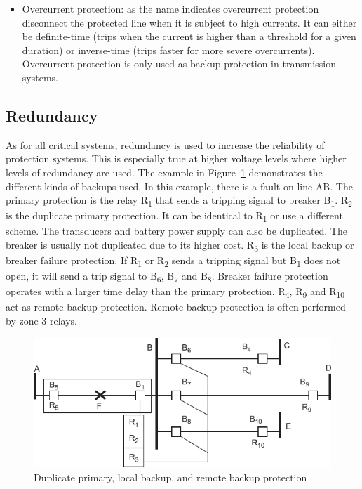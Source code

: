 \begin{itemize}
    \item Overcurrent protection: as the name indicates overcurrent protection disconnect the protected line when it is subject to high currents. It can either be definite-time (trips when the current is higher than a threshold for a given duration) or inverse-time (trips faster for more severe overcurrents). Overcurrent protection is only used as backup protection in transmission systems.
\end{itemize}

\subsection{Redundancy}

As for all critical systems, redundancy is used to increase the reliability of protection systems. This is especially true at higher voltage levels where higher levels of redundancy are used. The example in Figure~\ref{fig:protectionBackup} demonstrates the different kinds of backups used. In this example, there is a fault on line AB. The primary protection is the relay R\textsubscript{1} that sends a tripping signal to breaker B\textsubscript{1}. R\textsubscript{2} is the duplicate primary protection. It can be identical to R\textsubscript{1} or use a different scheme. The transducers and battery power supply can also be duplicated. The breaker is usually not duplicated due to its higher cost. R\textsubscript{3} is the local backup or breaker failure protection. If R\textsubscript{1} or R\textsubscript{2} sends a tripping signal but B\textsubscript{1} does not open, it will send a trip signal to B\textsubscript{6}, B\textsubscript{7} and B\textsubscript{8}. Breaker failure protection operates with a larger time delay than the primary protection. R\textsubscript{4}, R\textsubscript{9} and R\textsubscript{10} act as remote backup protection. Remote backup protection is often performed by zone 3 relays.

\begin{figure}
    \centering
    \includegraphics[width=0.8\linewidth]{Figs/ProtectionBackup.pdf}
    \caption{Duplicate primary, local backup, and remote backup protection~\cite{HorowitzBook}}
    \label{fig:protectionBackup}
\end{figure}

